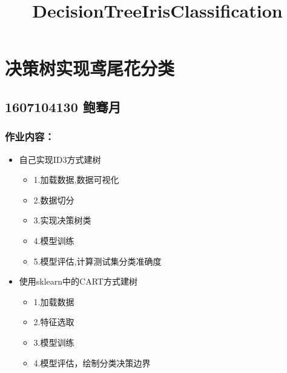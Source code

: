 \documentclass[11pt]{article}
\title{DecisionTreeIrisClassification}
\providecommand{\tightlist}{%
      \setlength{\itemsep}{0pt}\setlength{\parskip}{0pt}}
\begin{document}
    
    
    \maketitle
    
    

    
    \section{决策树实现鸢尾花分类}\label{ux51b3ux7b56ux6811ux5b9eux73b0ux9e22ux5c3eux82b1ux5206ux7c7b}

\subsection{1607104130 鲍骞月}\label{ux9c8dux9a9eux6708}

    \subsubsection{作业内容：}\label{ux4f5cux4e1aux5185ux5bb9}

\begin{itemize}
\tightlist
\item
  自己实现ID3方式建树

  \begin{itemize}
  \tightlist
  \item
    1.加载数据,数据可视化\\
  \item
    2.数据切分
  \item
    3.实现决策树类\\
  \item
    4.模型训练\\
  \item
    5.模型评估,计算测试集分类准确度\\
  \end{itemize}
\item
  使用sklearn中的CART方式建树

  \begin{itemize}
  \tightlist
  \item
    1.加载数据\\
  \item
    2.特征选取\\
  \item
    3.模型训练\\
  \item
    4.模型评估，绘制分类决策边界
  \end{itemize}
\end{itemize}
\end{document}
